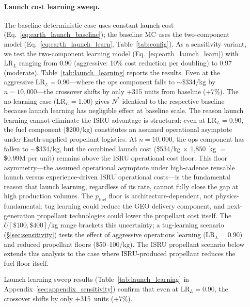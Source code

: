 \documentclass[preprint,12pt]{elsarticle}
\begin{document}
\paragraph{Launch cost learning sweep.} The baseline deterministic case uses constant launch cost (Eq.~\ref{eq:earth_launch_baseline}); the baseline MC uses the two-component model (Eq.~\ref{eq:earth_launch_learn}, Table~\ref{tab:config}). As a sensitivity variant, we test the two-component learning model (Eq.~\ref{eq:earth_launch_learn}) with $\mathrm{LR}_L$ ranging from 0.90 (aggressive: 10\% cost reduction per doubling) to 0.97 (moderate). Table~\ref{tab:launch_learning} reports the results. Even at the aggressive $\mathrm{LR}_L = 0.90$---where the ops component falls to $\sim$\$334/kg by $n = 10{,}000$---the crossover shifts by only $+$315 units from baseline (+7\%). The no-learning case ($\mathrm{LR}_L = 1.00$) gives $N^*$ identical to the respective baseline because launch learning has negligible effect at baseline scale. The reason launch learning cannot eliminate the ISRU advantage is structural: even at $\mathrm{LR}_L = 0.90$, the fuel component (\$200/kg) constitutes an assumed operational asymptote under Earth-supplied propellant logistics. At $n = 10{,}000$, the ops component has fallen to $\sim$\$334/kg, but the combined launch cost (\$534/kg $\times$ 1{,}850~kg $=$ \$0.99M per unit) remains above the ISRU operational cost floor. This floor asymmetry---the assumed operational asymptote under high-cadence reusable launch versus experience-driven ISRU operational costs---is the fundamental reason that launch learning, regardless of its rate, cannot fully close the gap at high production volumes. The $p_{\mathrm{fuel}}$ floor is architecture-dependent, not physics-fundamental: tug learning could reduce the GEO delivery component, and next-generation propellant technologies could lower the propellant cost itself. The $U[\$100, \$400]$/kg range brackets this uncertainty; a tug-learning scenario (\S\ref{sec:sensitivity}) tests the effect of aggressive operations learning ($\mathrm{LR}_L = 0.90$) and reduced propellant floors (\$50--100/kg). The ISRU propellant scenario below extends this analysis to the case where ISRU-produced propellant reduces the fuel floor itself.

Launch learning sweep results (Table~\ref{tab:launch_learning} in Appendix~\ref{sec:appendix_sensitivity}) confirm that even at $\mathrm{LR}_L = 0.90$, the crossover shifts by only $+$315~units ($+$7\%).
\end{document}
